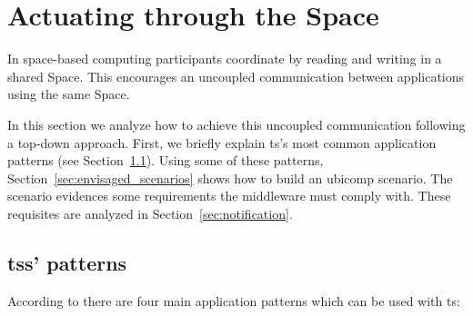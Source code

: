 
\section{Actuating through the Space}





In space-based computing participants coordinate by reading and writing in a shared Space. %
This encourages an uncoupled communication between applications using the same Space.

In this section we analyze how to achieve this uncoupled communication following a top-down approach.
First, we briefly explain \acl{ts}'s most common application patterns (see Section~\ref{sec:ts_patterns}). %
Using some of these patterns, Section~\ref{sec:envisaged_scenarios} shows how to build an \ac{ubicomp} scenario.
The scenario evidences some requirements the middleware must comply with.
These requisites are analyzed in Section~\ref{sec:notification}.



\subsection{\aclp{ts}' patterns}
\label{sec:ts_patterns}

According to \citet{freeman_javaspaces_1999} there are four main application patterns which can be used with \ac{ts}:

